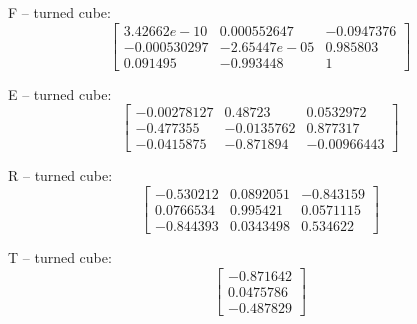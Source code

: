 \documentclass[10pt,a4paper]{article}
\begin{document}
F -- turned cube: 
\begin{equation*}
\begin{bmatrix}
3.42662e-10 & 0.000552647 & -0.0947376 \\ -0.000530297 & -2.65447e-05 & 0.985803 \\ 0.091495 & -0.993448 & 1
\end{bmatrix}
\end{equation*}

E -- turned cube: 
\begin{equation*}
\begin{bmatrix}
-0.00278127 & 0.48723 & 0.0532972 \\ -0.477355 & -0.0135762 & 0.877317 \\ -0.0415875 & -0.871894 & -0.00966443
\end{bmatrix}
\end{equation*}

R -- turned cube: 
\begin{equation*}
\begin{bmatrix}
-0.530212 & 0.0892051 & -0.843159 \\ 0.0766534 & 0.995421 & 0.0571115 \\ -0.844393 & 0.0343498 & 0.534622
\end{bmatrix}
\end{equation*}

T -- turned cube: 
\begin{equation*}
\begin{bmatrix}
-0.871642 \\ 0.0475786 \\ -0.487829
\end{bmatrix}
\end{equation*}
\end{document}
